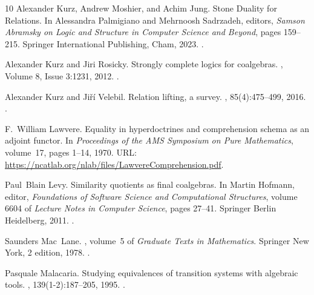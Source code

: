 \documentclass[10pt,a4paper]{article}
\begin{document}
\begin{thebibliography}{10}
Alexander Kurz, Andrew Moshier, and Achim Jung.
\newblock Stone {Duality} for {Relations}.
\newblock In Alessandra Palmigiano and Mehrnoosh Sadrzadeh, editors, {\em
  Samson {Abramsky} on {Logic} and {Structure} in {Computer} {Science} and
  {Beyond}}, pages 159--215. Springer International Publishing, Cham, 2023.
\newblock \href {https://doi.org/10.1007/978-3-031-24117-8_5}
  {}.

Alexander Kurz and Jiri Rosicky.
\newblock Strongly complete logics for coalgebras.
, Volume 8, Issue 3:1231,
  2012.
\newblock \href {https://doi.org/10.2168/LMCS-8(3:14)2012}
  {}.

Alexander Kurz and Jiří Velebil.
\newblock Relation lifting, a survey.
,
  85(4):475--499, 2016.
\newblock \href {https://doi.org/10.1016/j.jlamp.2015.08.002}
  {}.

F.~William Lawvere.
\newblock Equality in hyperdoctrines and comprehension schema as an adjoint
  functor.
\newblock In {\em Proceedings of the {AMS} Symposium on Pure Mathematics},
  volume~17, pages 1--14, 1970.
\newblock URL: \url{https://ncatlab.org/nlab/files/LawvereComprehension.pdf}.

Paul~Blain Levy.
\newblock Similarity quotients as final coalgebras.
\newblock In Martin Hofmann, editor, {\em Foundations of Software Science and
  Computational Structures}, volume 6604 of {\em Lecture Notes in Computer
  Science}, pages 27--41. Springer Berlin Heidelberg, 2011.
\newblock \href {https://doi.org/10.1007/978-3-642-19805-2_3}
  {}.

Saunders Mac~Lane.
, volume~5 of {\em
  Graduate Texts in Mathematics}.
\newblock Springer New York, 2 edition, 1978.
\newblock \href {https://doi.org/10.1007/978-1-4757-4721-8}
  {}.

Pasquale Malacaria.
\newblock Studying equivalences of transition systems with algebraic tools.
, 139(1-2):187--205, 1995.
\newblock \href {https://doi.org/10.1016/0304-3975(94)00047-M}
  {}.


\end{thebibliography}
\end{document}
